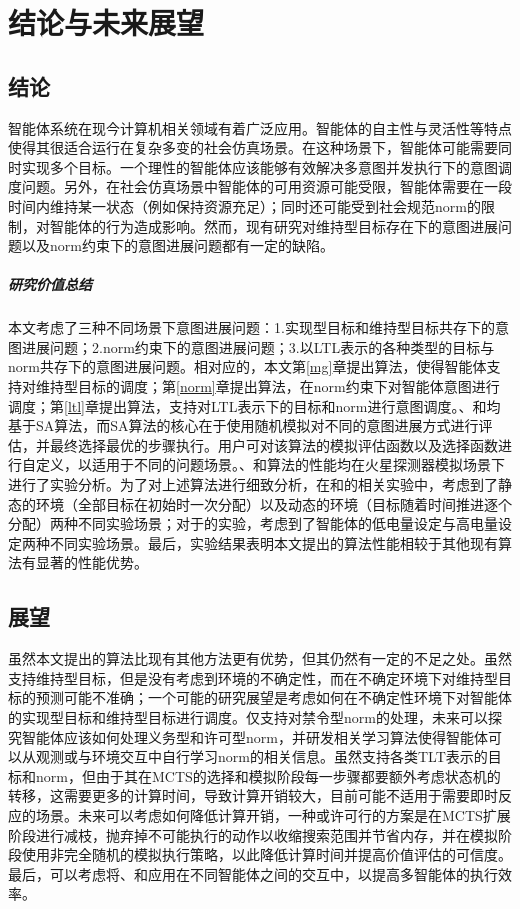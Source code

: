 \chapter{结论与未来展望}
\section{结论}
智能体系统在现今计算机相关领域有着广泛应用。智能体的自主性与灵活性等特点使得其很适合运行在复杂多变的社会仿真场景。在这种场景下，智能体可能需要同时实现多个目标。一个理性的智能体应该能够有效解决多意图并发执行下的意图调度问题。另外，在社会仿真场景中智能体的可用资源可能受限，智能体需要在一段时间内维持某一状态（例如保持资源充足）；同时还可能受到社会规范norm的限制，对智能体的行为造成影响。然而，现有研究对维持型目标存在下的意图进展问题以及norm约束下的意图进展问题都有一定的缺陷。
\paragraph{研究价值总结}
本文考虑了三种不同场景下意图进展问题：1.实现型目标和维持型目标共存下的意图进展问题；2.norm约束下的意图进展问题；3.以LTL表示的各种类型的目标与norm共存下的意图进展问题。相对应的，本文第\ref{mg}章提出\SAM 算法，使得智能体支持对维持型目标的调度；第\ref{norm}章提出\SAN 算法，在norm约束下对智能体意图进行调度；第\ref{ltl}章提出\SAT 算法，支持对LTL表示下的目标和norm进行意图调度。\SAM 、\SAN 和\SAT 均基于SA算法，而SA算法的核心在于使用随机模拟对不同的意图进展方式进行评估，并最终选择最优的步骤执行。用户可对该算法的模拟评估函数以及选择函数进行自定义，以适用于不同的问题场景。\SAM 、\SAN 和\SAT 算法的性能均在火星探测器模拟场景下进行了实验分析。为了对上述算法进行细致分析，在\SAM 和\SAN 的相关实验中，考虑到了静态的环境（全部目标在初始时一次分配）以及动态的环境（目标随着时间推进逐个分配）两种不同实验场景；对于\SAT 的实验，考虑到了智能体的低电量设定与高电量设定两种不同实验场景。最后，实验结果表明本文提出的算法性能相较于其他现有算法有显著的性能优势。
\section{展望}
虽然本文提出的算法比现有其他方法更有优势，但其仍然有一定的不足之处。\SAM 虽然支持维持型目标，但是没有考虑到环境的不确定性，而在不确定环境下\SAM 对维持型目标的预测可能不准确；一个可能的研究展望是考虑如何在不确定性环境下对智能体的实现型目标和维持型目标进行调度。\SAN 仅支持对禁令型norm的处理，未来可以探究智能体应该如何处理义务型和许可型norm，并研发相关学习算法使得智能体可以从观测或与环境交互中自行学习norm的相关信息。\SAT 虽然支持各类TLT表示的目标和norm，但由于其在MCTS的选择和模拟阶段每一步骤都要额外考虑状态机的转移，这需要更多的计算时间，导致计算开销较大，目前可能不适用于需要即时反应的场景。未来可以考虑如何降低计算开销，一种或许可行的方案是在MCTS扩展阶段进行减枝，抛弃掉不可能执行的动作以收缩搜索范围并节省内存，并在模拟阶段使用非完全随机的模拟执行策略，以此降低计算时间并提高价值评估的可信度。最后，可以考虑将\SAM 、\SAN 和\SAT 应用在不同智能体之间的交互中，以提高多智能体的执行效率。
